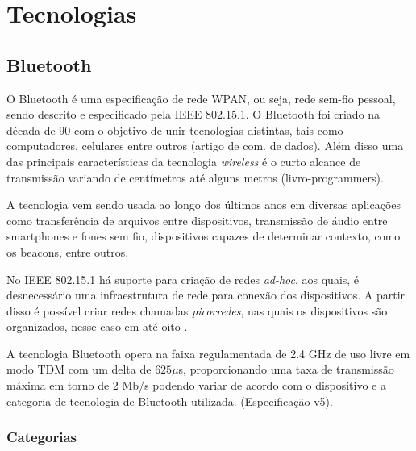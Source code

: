 \documentclass[
	article,			%
	11pt,				%
	oneside,			%
	a4paper,			%
	section=TITLE,		%
	subsection=TITLE,	%
	english,			%
	brazil,				%
	sumario=tradicional
	]{abntex2}
\begin{document}



\section{Tecnologias}

\subsection{Bluetooth}

O Bluetooth é uma especificação de rede WPAN, ou seja, rede sem-fio pessoal, sendo descrito e 
especificado pela IEEE 802.15.1. O Bluetooth foi criado na década de 90 com o objetivo de unir 
tecnologias distintas, tais como computadores, celulares entre outros (artigo de com. de dados). 
Além disso uma das principais características da tecnologia \textit{wireless} é o curto alcance de 
transmissão variando de centímetros até alguns metros (livro-programmers). 

A tecnologia vem sendo usada ao longo dos últimos anos em diversas aplicações como transferência de 
arquivos entre dispositivos, transmissão de áudio entre smartphones e fones sem fio, dispositivos 
capazes de determinar contexto, como os beacons, entre outros.

No IEEE 802.15.1 há suporte para criação de redes \textit{ad-hoc}, aos quais, é desnecessário uma 
infraestrutura de rede para conexão dos dispositivos. A partir disso é possível criar redes 
chamadas \textit{picorredes}, nas quais os dispositivos são organizados, nesse caso em até oito .

A tecnologia Bluetooth opera na faixa regulamentada de 2.4 GHz de uso livre em modo TDM com um 
delta de $625\mu$s, proporcionando uma taxa de transmissão máxima em torno de 2 Mb/s podendo variar 
de acordo com o dispositivo e a categoria de tecnologia de Bluetooth utilizada. (Especificação v5).


\subsubsection{Categorias}
\end{document}
